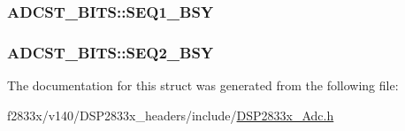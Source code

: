 \subsubsection[{S\+E\+Q1\+\_\+\+B\+S\+Y}]{ A\+D\+C\+S\+T\+\_\+\+B\+I\+T\+S\+::\+S\+E\+Q1\+\_\+\+B\+S\+Y}\label{struct_a_d_c_s_t___b_i_t_s_a5246d56ae34c061489ef2d7c3d83818e}
\hypertarget{struct_a_d_c_s_t___b_i_t_s_ae6024e3eeb0ccfe32a34292191a348cd}{}
\subsubsection[{S\+E\+Q2\+\_\+\+B\+S\+Y}]{ A\+D\+C\+S\+T\+\_\+\+B\+I\+T\+S\+::\+S\+E\+Q2\+\_\+\+B\+S\+Y}\label{struct_a_d_c_s_t___b_i_t_s_ae6024e3eeb0ccfe32a34292191a348cd}


The documentation for this struct was generated from the following file\+:\begin{DoxyCompactItemize}
\item 
f2833x/v140/\+D\+S\+P2833x\+\_\+headers/include/\hyperlink{_d_s_p2833x___adc_8h}{D\+S\+P2833x\+\_\+\+Adc.\+h}\end{DoxyCompactItemize}
